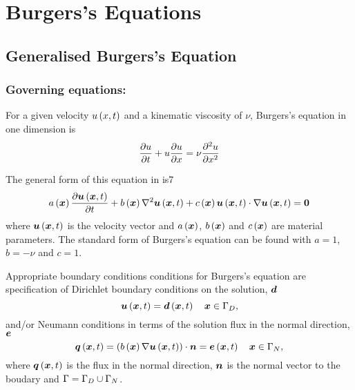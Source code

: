\section{Burgers's Equations}

\subsection{Generalised Burgers's Equation}

\subsubsection{Governing equations:}

For a given velocity $ u\left( x,t \right) $ and a kinematic viscosity of $\nu$, Burgers's equation
in one dimension is
\begin{equation}
  \delby{u}{t}+u\delby{u}{x}=\nu\deltwosqby{u}{x}
  \label{eqn:Burgersequation}
\end{equation}

The general form of this equation in \OpenCMISS is7
\begin{equation}
  \fnof{a}{\vectr{x}}\delby{\fnof{\vectr{u}}{\vectr{x},t}}{t}+\fnof{b}{\vectr{x}}\laplacian{}{\fnof{\vectr{u}}{\vectr{x},t}}+
  \fnof{c}{\vectr{x}}\dotprod{\fnof{\vectr{u}}{\vectr{x},t}}{\gradient{}{\fnof{\vectr{u}}{\vectr{x},t}}}=\vectr{0}
  \label{eqn:GeneralFormBurgersequation}
\end{equation}
where $ \boldsymbol{u}\left( \boldsymbol{x},t \right) $ is the velocity vector and
$ a\left( \boldsymbol{x} \right) $, $ b\left( \boldsymbol{x} \right) $ and $ c\left( \boldsymbol{x} \right) $ are
material parameters. The standard form of Burgers's equation can be found with
$a=1$, $b=-\nu$ and $c=1$.

Appropriate boundary conditions conditions for Burgers's
equation are specification of Dirichlet boundary conditions on the solution,
$\boldsymbol{d}$ \ie
\begin{equation}
  \fnof{\vectr{u}}{\vectr{x},t} = \fnof{\vectr{d}}{\vectr{x},t} \quad \vectr{x}\in\Gamma_{D},
  \label{eqn:BurgersDirichletBC} 
\end{equation}
and/or Neumann conditions in terms of the solution flux in the normal
direction, $\boldsymbol{e}$ \ie
\begin{equation}
  \fnof{\vectr{q}}{\vectr{x},t} = \dotprod{\pbrac{\fnof{b}{\vectr{x}}
      \gradient{}{\fnof{\vectr{u}}{\vectr{x},t}}}}{\normal} =
  \fnof{\vectr{e}}{\vectr{x},t} \quad \vectr{x}\in\Gamma_{N},
  \label{eqn:BurgersNeumannBC} 
\end{equation}
where $ \boldsymbol{q}\left( \boldsymbol{x},t \right) $ is the flux in the normal direction, $\boldsymbol{n}$ is the normal
vector to the boudary and $\Gamma=\Gamma_{D}\cup\Gamma_{N}$.

